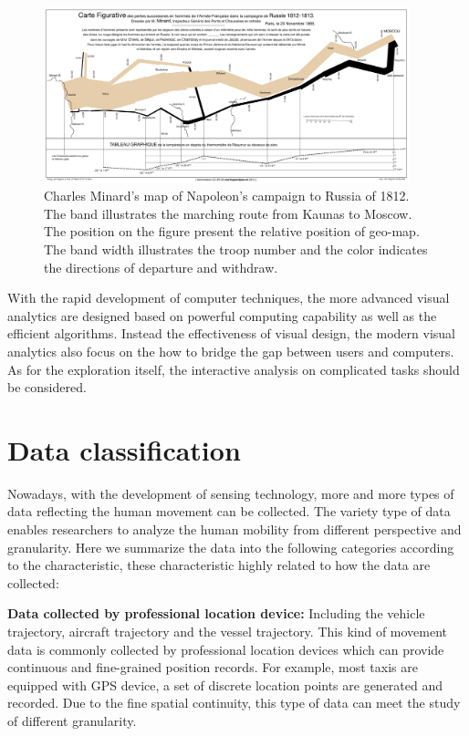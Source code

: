 \begin{figure}[!htb]
  \centering
  \includegraphics[width = 400px]{figures/Napoleon_war.png}
  \caption{Charles Minard's map of Napoleon’s campaign to Russia of 1812. The band illustrates the marching route from Kaunas to Moscow. The position on the figure present the relative position of geo-map. The band width illustrates the troop number and the color indicates the directions of departure and withdraw. }
  \label{fig:napoleon}
\end{figure}

With the rapid development of computer techniques, the more advanced visual analytics are designed based on powerful computing capability as well as the efficient algorithms. Instead the effectiveness of visual design, the modern visual analytics also focus on the how to bridge the gap between users and computers. As for the exploration itself, the interactive analysis on complicated tasks should be considered. 

\section{Data classification}

Nowadays, with the development of sensing technology, more and more types of data reflecting the human movement can be collected. The variety type of data enables researchers to analyze the human mobility from different perspective and granularity. Here we summarize the data into the following categories according to the characteristic, these characteristic highly related to how the data are collected: 

\textbf{Data collected by professional location device:} Including the vehicle trajectory\cite{liu2017smartadp}, aircraft trajectory\cite{lampe2011interactive} and the vessel trajectory\cite{willems2009visualization}. This kind of movement data is commonly collected by professional location devices which can provide continuous and fine-grained position records. For example, most taxis are equipped with GPS device, a set of discrete location points are generated and recorded. Due to the fine spatial continuity, this type of data can meet the study of different granularity.

